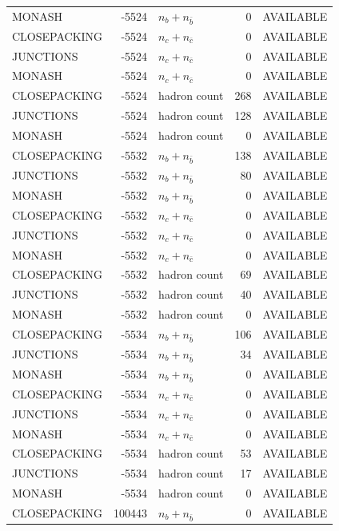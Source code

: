 \begin{landscape}
\begin{longtable}{@{}lrlrl@{}}
MONASH & -5524 & $n_b+n_{\bar b}$ & \num{0} & AVAILABLE \\
CLOSEPACKING & -5524 & $n_c+n_{\bar c}$ & \num{0} & AVAILABLE \\
JUNCTIONS & -5524 & $n_c+n_{\bar c}$ & \num{0} & AVAILABLE \\
MONASH & -5524 & $n_c+n_{\bar c}$ & \num{0} & AVAILABLE \\
CLOSEPACKING & -5524 & hadron count & \num{268} & AVAILABLE \\
JUNCTIONS & -5524 & hadron count & \num{128} & AVAILABLE \\
MONASH & -5524 & hadron count & \num{0} & AVAILABLE \\
CLOSEPACKING & -5532 & $n_b+n_{\bar b}$ & \num{138} & AVAILABLE \\
JUNCTIONS & -5532 & $n_b+n_{\bar b}$ & \num{80} & AVAILABLE \\
MONASH & -5532 & $n_b+n_{\bar b}$ & \num{0} & AVAILABLE \\
CLOSEPACKING & -5532 & $n_c+n_{\bar c}$ & \num{0} & AVAILABLE \\
JUNCTIONS & -5532 & $n_c+n_{\bar c}$ & \num{0} & AVAILABLE \\
MONASH & -5532 & $n_c+n_{\bar c}$ & \num{0} & AVAILABLE \\
CLOSEPACKING & -5532 & hadron count & \num{69} & AVAILABLE \\
JUNCTIONS & -5532 & hadron count & \num{40} & AVAILABLE \\
MONASH & -5532 & hadron count & \num{0} & AVAILABLE \\
CLOSEPACKING & -5534 & $n_b+n_{\bar b}$ & \num{106} & AVAILABLE \\
JUNCTIONS & -5534 & $n_b+n_{\bar b}$ & \num{34} & AVAILABLE \\
MONASH & -5534 & $n_b+n_{\bar b}$ & \num{0} & AVAILABLE \\
CLOSEPACKING & -5534 & $n_c+n_{\bar c}$ & \num{0} & AVAILABLE \\
JUNCTIONS & -5534 & $n_c+n_{\bar c}$ & \num{0} & AVAILABLE \\
MONASH & -5534 & $n_c+n_{\bar c}$ & \num{0} & AVAILABLE \\
CLOSEPACKING & -5534 & hadron count & \num{53} & AVAILABLE \\
JUNCTIONS & -5534 & hadron count & \num{17} & AVAILABLE \\
MONASH & -5534 & hadron count & \num{0} & AVAILABLE \\
CLOSEPACKING & 100443 & $n_b+n_{\bar b}$ & \num{0} & AVAILABLE \\

\end{longtable}
\end{landscape}
